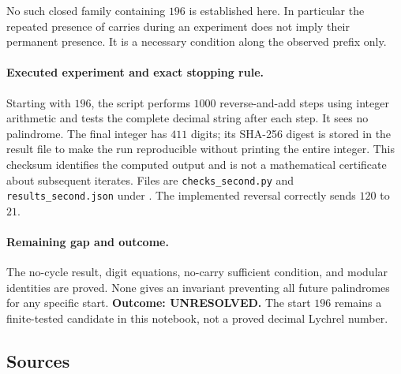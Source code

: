 \documentclass[11pt,a4paper]{article}
\begin{document}
No such closed family containing $196$ is established here. In
particular the repeated presence of carries during an experiment does
not imply their permanent presence. It is a necessary condition along
the observed prefix only.

\paragraph{Executed experiment and exact stopping rule.}
Starting with $196$, the script performs $1000$ reverse-and-add steps
using integer arithmetic and tests the complete decimal string after
each step. It sees no palindrome. The final integer has $411$ digits;
its SHA-256 digest is stored in the result file to make the run
reproducible without printing the entire integer. This checksum
identifies the computed output and is not a mathematical certificate
about subsequent iterates. Files are \texttt{checks\_second.py} and
\texttt{results\_second.json} under
.
The implemented reversal correctly sends $120$ to $21$.

\paragraph{Remaining gap and outcome.}
The no-cycle result, digit equations, no-carry sufficient condition,
and modular identities are proved. None gives an invariant preventing
all future palindromes for any specific start. \textbf{Outcome:
UNRESOLVED.} The start $196$ remains a finite-tested candidate in this
notebook, not a proved decimal Lychrel number.

\subsection{Sources}
\end{document}

